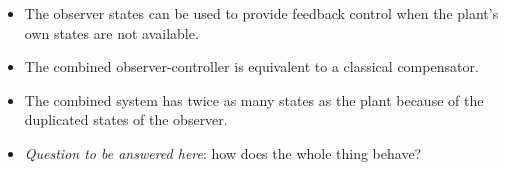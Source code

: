 \begin{itemize}
	\item The observer states can be used to provide feedback control when the plant's own states are not available. 
	\item The combined observer-controller is equivalent to a classical compensator. 
	\item The combined system has twice as many states as the plant because of the duplicated states of the observer. 
	\item \emph{Question to be answered here}: how does the whole thing behave?
\end{itemize}

\endinput

